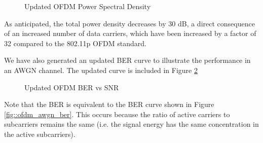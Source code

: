 \documentclass[conference]{IEEEtran}
\begin{document}
\begin{figure}[H]
\centering
{}
\caption{Updated OFDM Power Spectral Density}
\label{fig::updated_ofdm_psd}
\end{figure} 

As anticipated, the total power density decreases by 30 dB, a direct consequence of an increased number of data carriers, which have been increased by a factor of 32 compared to the 802.11p OFDM standard.

We have also generated an updated BER curve to illustrate the performance in an AWGN channel. The updated curve is included in Figure \ref{fig::updated_ofdm_ber}

\begin{figure}[H]
\centering
{}
\caption{Updated OFDM BER vs SNR}
\label{fig::updated_ofdm_ber}
\end{figure}

Note that the BER is equivalent to the BER curve shown in Figure \ref{fig::ofdm_awgn_ber}. This occurs because the ratio of active carriers to subcarriers remains the same (i.e. the signal energy has the same concentration in the active subcarriers).
\end{document}
